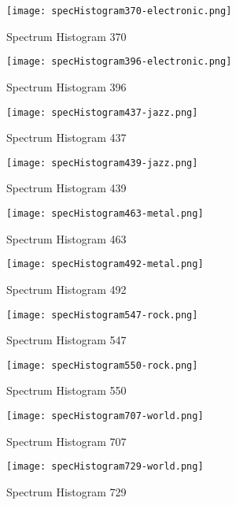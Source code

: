 \documentclass{article} %
\begin{document}
\begin{figure}[H]
\centering
\texttt{[image: specHistogram370-electronic.png]}
\caption{Spectrum Histogram 370}
\label{fig:hist370}
\end{figure}

\begin{figure}[H]
\centering
\texttt{[image: specHistogram396-electronic.png]}
\caption{Spectrum Histogram 396}
\label{fig:hist396}
\end{figure}

\begin{figure}[H]
\centering
\texttt{[image: specHistogram437-jazz.png]}
\caption{Spectrum Histogram 437}
\label{fig:hist437}
\end{figure}

\begin{figure}[H]
\centering
\texttt{[image: specHistogram439-jazz.png]}
\caption{Spectrum Histogram 439}
\label{fig:hist439}
\end{figure}

\begin{figure}[H]
\centering
\texttt{[image: specHistogram463-metal.png]}
\caption{Spectrum Histogram 463}
\label{fig:hist463}
\end{figure}

\begin{figure}[H]
\centering
\texttt{[image: specHistogram492-metal.png]}
\caption{Spectrum Histogram 492}
\label{fig:hist492}
\end{figure}

\begin{figure}[H]
\centering
\texttt{[image: specHistogram547-rock.png]}
\caption{Spectrum Histogram 547}
\label{fig:hist547}
\end{figure}

\begin{figure}[H]
\centering
\texttt{[image: specHistogram550-rock.png]}
\caption{Spectrum Histogram 550}
\label{fig:hist550}
\end{figure}

\begin{figure}[H]
\centering
\texttt{[image: specHistogram707-world.png]}
\caption{Spectrum Histogram 707}
\label{fig:hist707}
\end{figure}

\begin{figure}[H]
\centering
\texttt{[image: specHistogram729-world.png]}
\caption{Spectrum Histogram 729}
\label{fig:hist729}
\end{figure}
\clearpage
\end{document}
